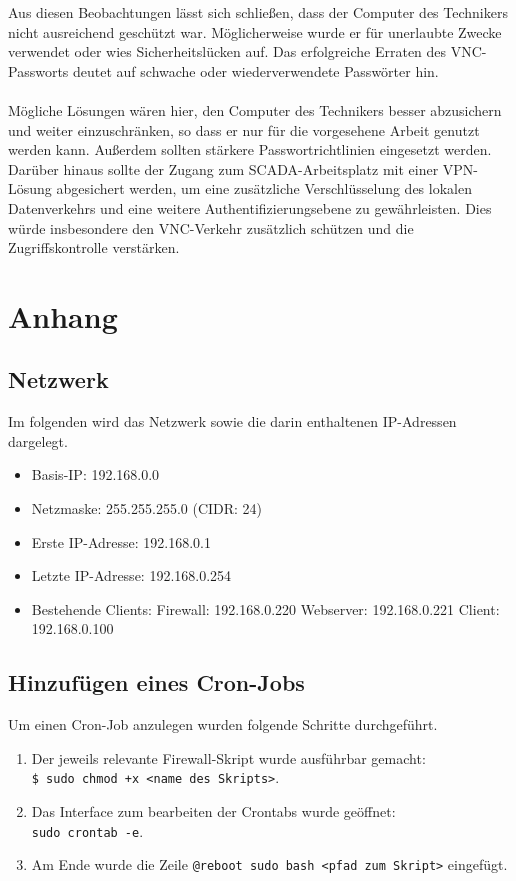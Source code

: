 \documentclass[
    a4paper,
    pagesize,
	pdftex,
    12pt,
]{scrartcl}
\begin{document}
Aus diesen Beobachtungen lässt sich schließen, dass der Computer des Technikers nicht ausreichend geschützt war. Möglicherweise wurde er für unerlaubte Zwecke verwendet oder wies Sicherheitslücken auf. Das erfolgreiche Erraten des VNC-Passworts deutet auf schwache oder wiederverwendete Passwörter hin.
\\ \\
Mögliche Lösungen wären hier, den Computer des Technikers besser abzusichern und weiter einzuschränken, so dass er nur für die vorgesehene Arbeit genutzt werden kann. Außerdem sollten stärkere Passwortrichtlinien eingesetzt werden. Darüber hinaus sollte der Zugang zum SCADA-Arbeitsplatz mit einer VPN-Lösung abgesichert werden, um eine zusätzliche Verschlüsselung des lokalen Datenverkehrs und eine weitere Authentifizierungsebene zu gewährleisten. Dies würde insbesondere den VNC-Verkehr zusätzlich schützen und die Zugriffskontrolle verstärken.

\newpage
\section{Anhang}

\subsection{Netzwerk}
Im folgenden wird das Netzwerk sowie die darin enthaltenen IP-Adressen dargelegt.
\begin{itemize}
	\item Basis-IP: 192.168.0.0
	\item Netzmaske: 255.255.255.0 (CIDR: 24)
	\item Erste IP-Adresse: 192.168.0.1
	\item Letzte IP-Adresse: 192.168.0.254
	\item Bestehende Clients:
		\subitem Firewall: 192.168.0.220
		\subitem Webserver: 192.168.0.221
		\subitem Client: 192.168.0.100
\end{itemize}

\subsection{Hinzufügen eines Cron-Jobs}\label{cron-job}
Um einen Cron-Job anzulegen wurden folgende Schritte durchgeführt.
\begin{enumerate}
	\item Der jeweils relevante Firewall-Skript wurde ausführbar gemacht: \\ \lstinline[breaklines]|$ sudo chmod +x <name des Skripts>|.
	\item Das Interface zum bearbeiten der Crontabs wurde geöffnet: \\ \lstinline[breaklines]|sudo crontab -e|.
	\item Am Ende wurde die Zeile \lstinline[breaklines]|@reboot sudo bash <pfad zum Skript>| eingefügt.
\end{enumerate}
\end{document}
